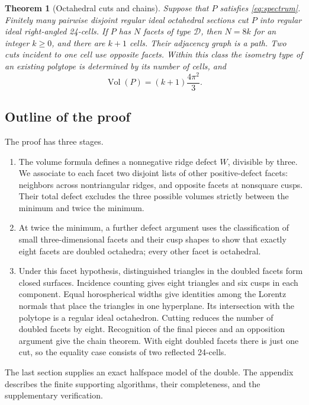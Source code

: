 \documentclass[11pt]{article}
\newtheorem{theorem}{Theorem}[section]
\theoremstyle{remark}
\newcommand{\Vol}{\operatorname{Vol}}
\newcommand{\DBL}{\mathcal D}
\begin{document}
\begin{theorem}[Octahedral cuts and chains]\label{thm:chain}
Suppose that $P$ satisfies \eqref{eq:spectrum}. Finitely many pairwise
disjoint regular ideal octahedral sections cut $P$ into regular ideal
right-angled 24-cells. If $P$ has $N$ facets of type $\DBL$, then
$N=8k$ for an integer $k\ge0$, and there are $k+1$ cells. Their
adjacency graph is a path. Two cuts incident to one cell use opposite
facets. Within this class the isometry type of an existing polytope
is determined by its number of cells, and
\[
 \Vol(P)=(k+1)\frac{4\pi^2}{3}.
\]
\end{theorem}
\subsection{Outline of the proof}

The proof has three stages.
\begin{enumerate}
\item The volume formula defines a nonnegative ridge defect $W$,
divisible by three. We associate to each facet two disjoint lists
of other positive-defect facets: neighbors across nontriangular
ridges, and opposite facets at nonsquare cusps. Their total defect
excludes the three possible volumes strictly between the minimum
and twice the minimum.
\item At twice the minimum, a further defect argument uses the
classification of small three-dimensional facets and their cusp
shapes to show that exactly eight facets are doubled octahedra;
every other facet is octahedral.
\item Under this facet hypothesis, distinguished triangles in the
doubled facets form closed surfaces. Incidence counting gives eight
triangles and six cusps in each component. Equal horospherical
widths give identities among the Lorentz normals that place the
triangles in one hyperplane. Its intersection with the polytope
is a regular ideal octahedron.
Cutting reduces the number of doubled facets by eight. Recognition
of the final pieces and an opposition argument give the chain
theorem. With eight doubled facets there is just one cut, so the
equality case consists of two reflected 24-cells.
\end{enumerate}
The last section supplies an exact halfspace model of the double.
The appendix describes the finite supporting algorithms, their
completeness, and the supplementary verification.
\end{document}
